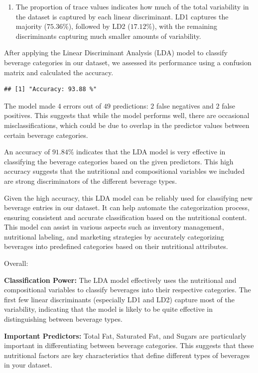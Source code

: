 \documentclass[
]{article}
\providecommand{\tightlist}{%
  \setlength{\itemsep}{0pt}\setlength{\parskip}{0pt}}
\begin{document}
\begin{enumerate}
\def\labelenumi{\arabic{enumi}.}
\setcounter{enumi}{3}
\tightlist
\item
  The proportion of trace values indicates how much of the total
  variability in the dataset is captured by each linear discriminant.
  LD1 captures the majority (\(75.36\)\%), followed by LD2
  (\(17.12\)\%), with the remaining discriminants capturing much smaller
  amounts of variability.
\end{enumerate}

After applying the Linear Discriminant Analysis (LDA) model to classify
beverage categories in our dataset, we assessed its performance using a
confusion matrix and calculated the accuracy.

\begin{verbatim}
## [1] "Accuracy: 93.88 %"
\end{verbatim}

The model made \(4\) errors out of \(49\) predictions: \(2\) false
negatives and \(2\) false positives. This suggests that while the model
performs well, there are occasional misclassifications, which could be
due to overlap in the predictor values between certain beverage
categories.

An accuracy of \(91.84\)\% indicates that the LDA model is very
effective in classifying the beverage categories based on the given
predictors. This high accuracy suggests that the nutritional and
compositional variables we included are strong discriminators of the
different beverage types.

Given the high accuracy, this LDA model can be reliably used for
classifying new beverage entries in our dataset. It can help automate
the categorization process, ensuring consistent and accurate
classification based on the nutritional content. This model can assist
in various aspects such as inventory management, nutritional labeling,
and marketing strategies by accurately categorizing beverages into
predefined categories based on their nutritional attributes.

Overall:

\textbf{Classification Power:} The LDA model effectively uses the
nutritional and compositional variables to classify beverages into their
respective categories. The first few linear discriminants (especially
LD1 and LD2) capture most of the variability, indicating that the model
is likely to be quite effective in distinguishing between beverage
types.

\textbf{Important Predictors:} Total Fat, Saturated Fat, and Sugars are
particularly important in differentiating between beverage categories.
This suggests that these nutritional factors are key characteristics
that define different types of beverages in your dataset.
\end{document}
